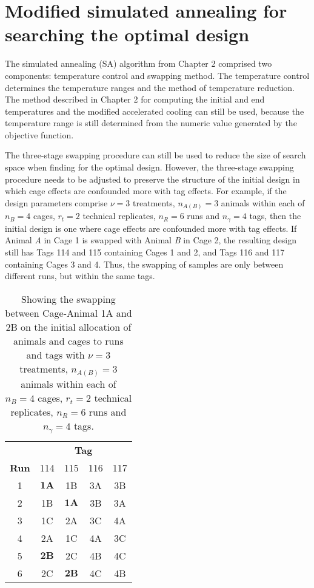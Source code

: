\section{Modified simulated annealing for searching the optimal design}
\label{sec:RCBDsa}
The simulated annealing (SA) algorithm from Chapter 2 comprised two components: temperature control and swapping method. The temperature control determines the temperature ranges and the method of temperature reduction. The method described in Chapter 2 for computing the initial and end temperatures and the modified accelerated cooling can still be used, because the temperature range is still determined from the numeric value generated by the objective function. 

The three-stage swapping procedure can still be used to reduce the size of search space when finding for the optimal design. However, the three-stage swapping procedure needs to be adjusted to preserve the structure of the initial design in which cage effects are confounded more with tag effects. For example, if the design parameters comprise $\nu = 3$ treatments, $n_{A(B)} = 3$ animals within each of $n_B = 4$ cages, $r_t = 2$ technical replicates, $n_R = 6$ runs and $n_\gamma = 4$ tags, then the initial design is one where cage effects are confounded more with tag effects. If Animal \textit{A} in Cage 1 is swapped with Animal \textit{B} in Cage 2, the resulting design still has Tags 114 and 115 containing Cages 1 and 2, and Tags 116 and 117 containing Cages 3 and 4. Thus, the swapping of samples are only between different runs, but within the same tags. 

\begin{table}[ht]                                       
\centering  
\itshape                                            
\caption{Showing the swapping between Cage-Animal 1A and 2B on the initial allocation of animals and cages to runs and tags with $\nu = 3$ treatments, $n_{A(B)} = 3$ animals within each of $n_B = 4$ cages, $r_t = 2$ technical replicates, $n_R = 6$ runs and $n_\gamma = 4$ tags.}           
\begin{tabular}{c|cccc}                                 
 & \multicolumn{4}{c}{{\bf Tag}} \\                     
{\bf Run}  & \textnormal{114} & \textnormal{115} & \textnormal{116} & \textnormal{117} \\ 
\hline                                                  
\textnormal{1}  & $\bm{1A}$ & 1B & 3A & 3B \\  
\textnormal{2}  & 1B & $\bm{1A}$ & 3B & 3A \\  
\textnormal{3}  & 1C & 2A & 3C & 4A \\  
\textnormal{4}  & 2A & 1C & 4A & 3C \\  
\textnormal{5}  & $\bm{2B}$ & 2C & 4B & 4C \\  
\textnormal{6}  & 2C & $\bm{2B}$ & 4C & 4B \\        
\end{tabular}                                           
\label{tab:iniCagAniDesEXSwap}                                  
\end{table}    

